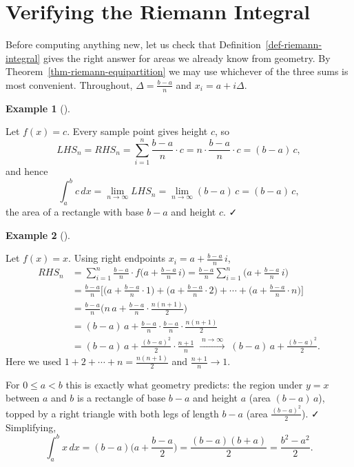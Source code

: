 \documentclass[
  letterpaper,
  DIV=11,
  numbers=noendperiod]{scrreprt}
\theoremstyle{plain}
\theoremstyle{plain}
\theoremstyle{definition}
\theoremstyle{definition}
\theoremstyle{definition}
\newtheorem{example}{Example}[chapter]
\theoremstyle{plain}
\theoremstyle{plain}
\theoremstyle{remark}
\begin{document}
\section{Verifying the Riemann
Integral}\label{verifying-the-riemann-integral}

Before computing anything new, let us check that
Definition~\ref{def-riemann-integral} gives the right answer for areas
we already know from geometry. By
Theorem~\ref{thm-riemann-equipartition} we may use whichever of the
three sums is most convenient. Throughout, \(\Delta = \frac{b-a}{n}\)
and \(x_i = a + i\Delta\).

\begin{example}[]\protect\hypertarget{exm-integral-constant}{}\label{exm-integral-constant}

\hfill\break
Let \(f(x) = c\). Every sample point gives height \(c\), so \[
LHS_n = RHS_n = \sum_{i=1}^n \frac{b-a}{n}\cdot c = n\cdot\frac{b-a}{n}\cdot c = (b-a)\,c,
\] and hence \[
\int_a^b c\,dx = \lim_{n\to\infty} LHS_n = \lim_{n\to\infty}(b-a)\,c = (b-a)\,c,
\] the area of a rectangle with base \(b-a\) and height \(c\). ✓

\end{example}

\begin{example}[]\protect\hypertarget{exm-integral-x}{}\label{exm-integral-x}

\hfill\break
Let \(f(x) = x\). Using right endpoints \(x_i = a+\frac{b-a}{n}\,i\), \[
\begin{aligned}
RHS_n &= \sum_{i=1}^n \frac{b-a}{n}\cdot f\Big(a+\frac{b-a}{n}\,i\Big)
= \frac{b-a}{n}\sum_{i=1}^n \Big(a+\frac{b-a}{n}\,i\Big) \\
&= \frac{b-a}{n}\Big[\Big(a+\frac{b-a}{n}\cdot1\Big)+\Big(a+\frac{b-a}{n}\cdot2\Big)
+\cdots+\Big(a+\frac{b-a}{n}\cdot n\Big)\Big] \\
&= \frac{b-a}{n}\Big(n\,a + \frac{b-a}{n}\cdot\frac{n(n+1)}{2}\Big) \\
&= (b-a)\,a + \frac{b-a}{n}\cdot\frac{b-a}{n}\cdot\frac{n(n+1)}{2} \\
&= (b-a)\,a + \frac{(b-a)^2}{2}\cdot\frac{n+1}{n}
\;\xrightarrow{\;n\to\infty\;}\; (b-a)\,a + \frac{(b-a)^2}{2}.
\end{aligned}
\] Here we used \(1+2+\cdots+n = \frac{n(n+1)}{2}\) and
\(\frac{n+1}{n}\to1\).

For \(0\le a<b\) this is exactly what geometry predicts: the region
under \(y=x\) between \(a\) and \(b\) is a rectangle of base \(b-a\) and
height \(a\) (area \((b-a)\,a\)), topped by a right triangle with both
legs of length \(b-a\) (area \(\frac{(b-a)^2}{2}\)). ✓ Simplifying, \[
\int_a^b x\,dx = (b-a)\Big(a + \frac{b-a}{2}\Big) = \frac{(b-a)(b+a)}{2} = \frac{b^2-a^2}{2}.
\]

\end{example}
\end{document}
